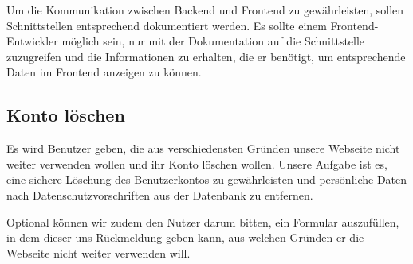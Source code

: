 Um die Kommunikation zwischen Backend und Frontend zu gewährleisten, sollen Schnittstellen entsprechend dokumentiert werden. Es sollte einem Frontend-Entwickler möglich sein, nur mit der Dokumentation auf die Schnittstelle zuzugreifen und die Informationen zu erhalten, die er benötigt, um entsprechende Daten im Frontend anzeigen zu können.

\subsection{Konto löschen}
Es wird Benutzer geben, die aus verschiedensten Gründen unsere Webseite nicht weiter verwenden wollen und ihr Konto löschen wollen. Unsere Aufgabe ist es, eine sichere Löschung des Benutzerkontos zu gewährleisten und persönliche Daten nach Datenschutzvorschriften aus der Datenbank zu entfernen.

Optional können wir zudem den Nutzer darum bitten, ein Formular auszufüllen, in dem dieser uns Rückmeldung geben kann, aus welchen Gründen er die Webseite nicht weiter verwenden will.
